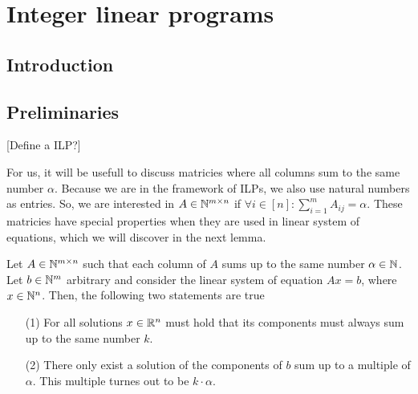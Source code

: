 \chapter{Integer linear programs}
\section{Introduction}

\section{Preliminaries}
[Define a ILP?]

For us, it will be usefull to discuss matricies where all columns sum to the same number $\alpha$. Because we are in the framework of ILPs, we also use natural numbers as entries. So, we are interested in $A \in \mathbb{N}^{m \times n}$ if $\forall i \in [n]\colon \sum_{i=1}^{m}A_{ij} = \alpha$. These matricies have special properties when they are used in linear system of equations, which we will discover in the next lemma.

\begin{lemma}
    \label{lemma:ilp_pre1}
    Let $A\in \mathbb{N}^{m \times n}$ such that each column of $A$ sums up to the same number $\alpha \in \mathbb{N}$. Let $b \in \mathbb{N}^m$ arbitrary and consider the linear system of equation $Ax=b$, where $x \in \mathbb{N}^n$. Then, the following two statements are true

    \begin{enumerate}
        \item[(1)] For all solutions $x \in \mathbb{R}^n$ must hold that its components must always sum up to the same number $k$.
        \item[(2)] There only exist a solution of the components of $b$ sum up to a multiple of $\alpha$. This multiple turnes out to be $k \cdot \alpha$.
    \end{enumerate}
\end{lemma}

